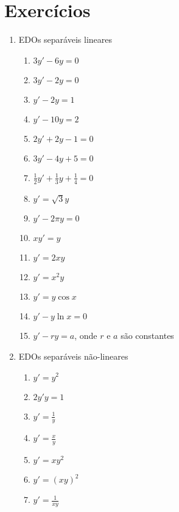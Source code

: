 \documentclass[a4paper]{article}
\begin{document}
\section{Exercícios}

\begin{enumerate}

\item EDOs separáveis lineares
  \begin{enumerate}
  \item $3y' -6y = 0 $
  \item $3y' -2y =0$
  \item $y' - 2y = 1$
  \item $y' - 10y = 2$
  \item $2y' + 2y -1 = 0$
  \item $3y'- 4y +5 = 0$
  \item $\frac{1}{2} y' + \frac{1}{3} y + \frac{1}{4} = 0$
  \item $y' = \sqrt{3}y$
  \item $y' -2\pi y =0$
  \item $xy' = y$
  \item $y' = 2xy$
  \item $y' = x^2y$
  \item $y' = y\cos x$
  \item $y' - y\ln x = 0$
  \item $y' -ry = a$, onde $r$ e $a$ são constantes

  \end{enumerate}

\item EDOs separáveis não-lineares
  \begin{enumerate}
  \item $y' = y^2$
  \item $2y'y = 1$
  \item $y' = \frac{1}{y}$
  \item $y' = \frac{x}{y}$
  \item $y' = xy^2$
  \item $y' = (xy)^2$
  \item $y' = \frac{1}{xy}$
  \end{enumerate}

\end{enumerate}
\end{document}
